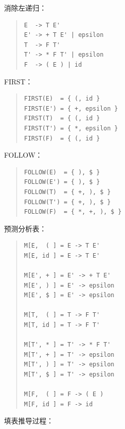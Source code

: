 \documentclass[UTF8,zihao=-4]{ctexart}
\begin{document}
消除左递归：

\begin{quote}
\footnotesize
\begin{verbatim}
E  -> T E'
E' -> + T E' | epsilon
T  -> F T'
T' -> * F T' | epsilon
F  -> ( E ) | id
\end{verbatim}
\end{quote}

FIRST：

\begin{quote}
\footnotesize
\begin{verbatim}
FIRST(E)  = { (, id }
FIRST(E') = { +, epsilon }
FIRST(T)  = { (, id }
FIRST(T') = { *, epsilon }
FIRST(F)  = { (, id }
\end{verbatim}
\end{quote}

FOLLOW：

\begin{quote}
\footnotesize
\begin{verbatim}
FOLLOW(E)  = { ), $ }
FOLLOW(E') = { ), $ }
FOLLOW(T)  = { +, ), $ }
FOLLOW(T') = { +, ), $ }
FOLLOW(F)  = { *, +, ), $ }
\end{verbatim}
\end{quote}

预测分析表：

\begin{quote}
\footnotesize
\begin{verbatim}
M[E,  ( ] = E -> T E'
M[E, id ] = E -> T E'

M[E', + ] = E' -> + T E'
M[E', ) ] = E' -> epsilon
M[E', $ ] = E' -> epsilon

M[T,  ( ] = T -> F T'
M[T, id ] = T -> F T'

M[T', * ] = T' -> * F T'
M[T', + ] = T' -> epsilon
M[T', ) ] = T' -> epsilon
M[T', $ ] = T' -> epsilon

M[F,  ( ] = F -> ( E )
M[F, id ] = F -> id
\end{verbatim}
\end{quote}

填表推导过程：
\end{document}
